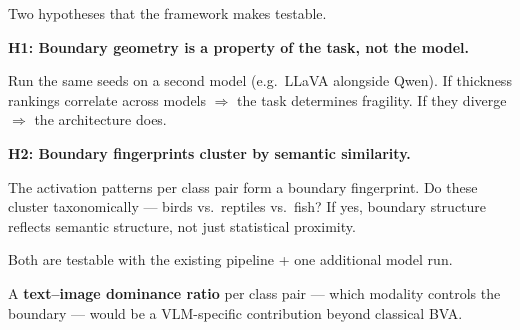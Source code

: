 \documentclass[aspectratio=169, 10pt, t]{beamer}
\newcommand{\sidenote}[1]{%
  \par\vspace{4pt}%
  \hspace{2pt}{\color{tumgray}\vrule width 1.5pt}\hspace{8pt}%
  \parbox{\dimexpr\textwidth-14pt}{\footnotesize\color{tumgray}#1}%
  \par\vspace{2pt}%
}
\begin{document}
\begin{frame}{Two hypotheses that the framework makes testable.}

\textbf{H1: Boundary geometry is a property of the task, not the model.}

\vspace{2pt}
\sidenote{Run the same seeds on a second model (e.g.\ LLaVA alongside Qwen). If \textcolor{tumblue}{thickness} rankings correlate across models $\Rightarrow$ the task determines fragility. If they diverge $\Rightarrow$ the architecture does.}

\vspace{10pt}

\textbf{H2: Boundary fingerprints cluster by semantic similarity.}

\vspace{2pt}
\sidenote{The activation patterns per class pair form a boundary fingerprint. Do these cluster taxonomically --- birds vs.\ reptiles vs.\ fish? If yes, boundary structure reflects semantic structure, not just statistical proximity.}

\vspace{14pt}

Both are testable with the existing pipeline + one additional model run.

\vspace{4pt}
\sidenote{A \textbf{text--image dominance ratio} per class pair --- which modality controls the boundary --- would be a VLM-specific contribution beyond classical BVA.}

\end{frame}
\end{document}

